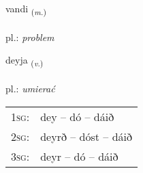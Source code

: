 \documentclass[frontgrid, backgrid]{flacards}\usepackage[]{graphicx}\usepackage[]{xcolor}
\begin{document}
\renewcommand{\flhead}{\vskip5pt \fboxsep=0pt {\small\bfseries\footnotesize Nafnorð | Noun}}
\renewcommand{\fcfoot}{\vskip5pt \fboxsep=0pt \hspace{2pt}{\small\bfseries\footnotesize 1K}}

\renewcommand{\blhead}{\vskip5pt {\small\bfseries\footnotesize Nafnorð | Noun }}
\renewcommand{\bcfoot}{\vskip5pt \hspace{2pt}{\small\bfseries\footnotesize 1K}}


{vandi \small{\textsubscript{(\textit{m.})}} \\[1ex] %
\textphonetic{[vantɪ]} \\
pl.: \emph{problem} \\  [2ex]
\renewcommand*{\arraystretch}{0.8}
}

\renewcommand{\flhead}{\vskip5pt \fboxsep=0pt {\small\bfseries\footnotesize Sagnorð | Verb}}
\renewcommand{\fcfoot}{\vskip5pt \fboxsep=0pt \hspace{2pt}{\small\bfseries\footnotesize 1K}}

\renewcommand{\blhead}{\vskip5pt {\small\bfseries\footnotesize Sagnorð | Verb }}
\renewcommand{\bcfoot}{\vskip5pt \hspace{2pt}{\small\bfseries\footnotesize 1K}}


{deyja \small{\textsubscript{(\textit{v.})}} \\[1ex] %
\textphonetic{[teiːja]} \\
pl.: \emph{umierać} \\  [2ex]
\renewcommand*{\arraystretch}{0.8}
\begin{tabular}{p{1cm}l}
\textsc{1sg}: & dey -- dó -- dáið \\ 
\textsc{2sg}: & deyrð -- dóst -- dáið \\ 
\textsc{3sg}: & deyr -- dó -- dáið \\ 
\end{tabular}
}
\end{document}
